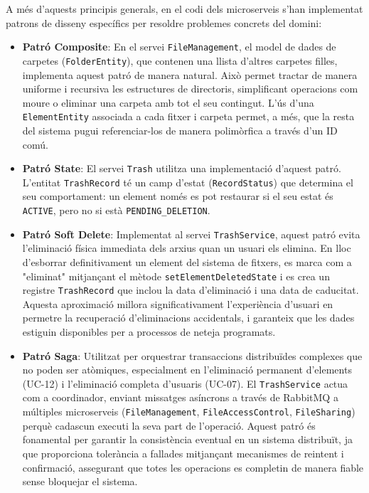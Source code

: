 A més d'aquests principis generals, en el codi dels microserveis s'han implementat patrons de disseny específics per resoldre problemes concrets del domini:
\begin{itemize}
    \item \textbf{Patró Composite}: En el servei \texttt{FileManagement}, el model de dades de carpetes (\texttt{FolderEntity}), que contenen una llista d'altres carpetes filles, implementa aquest patró de manera natural. Això permet tractar de manera uniforme i recursiva les estructures de directoris, simplificant operacions com moure o eliminar una carpeta amb tot el seu contingut. L'ús d'una \texttt{ElementEntity} associada a cada fitxer i carpeta permet, a més, que la resta del sistema pugui referenciar-los de manera polimòrfica a través d'un ID comú.

    \item \textbf{Patró State}: El servei \texttt{Trash} utilitza una implementació d'aquest patró. L'entitat \texttt{TrashRecord} té un camp d'estat (\texttt{RecordStatus}) que determina el seu comportament: un element només es pot restaurar si el seu estat és \texttt{ACTIVE}, pero no si està \texttt{PENDING\_DELETION}.

    \item \textbf{Patró Soft Delete}: Implementat al servei \texttt{TrashService}, aquest patró evita l'eliminació física immediata dels arxius quan un usuari els elimina. En lloc d'esborrar definitivament un element del sistema de fitxers, es marca com a "eliminat" mitjançant el mètode \texttt{setElementDeletedState} i es crea un registre \texttt{TrashRecord} que inclou la data d'eliminació i una data de caducitat. Aquesta aproximació millora significativament l'experiència d'usuari en permetre la recuperació d'eliminacions accidentals, i garanteix que les dades estiguin disponibles per a processos de neteja programats.

    \item \textbf{Patró Saga}: Utilitzat per orquestrar transaccions distribuïdes complexes que no poden ser atòmiques, especialment en l'eliminació permanent d'elements (UC-12) i l'eliminació completa d'usuaris (UC-07). El \texttt{TrashService} actua com a coordinador, enviant missatges asíncrons a través de RabbitMQ a múltiples microserveis (\texttt{FileManagement}, \texttt{FileAccessControl}, \texttt{FileSharing}) perquè cadascun executi la seva part de l'operació. Aquest patró és fonamental per garantir la consistència eventual en un sistema distribuït, ja que proporciona tolerància a fallades mitjançant mecanismes de reintent i confirmació, assegurant que totes les operacions es completin de manera fiable sense bloquejar el sistema.


\end{itemize}
